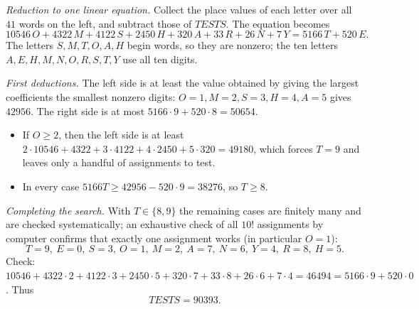 \emph{Reduction to one linear equation.} Collect the place values of each letter over all \(41\) words on the left, and subtract those of \(TESTS\). The equation becomes
\[
10546\,O+4322\,M+4122\,S+2450\,H+320\,A+33\,R+26\,N+7\,Y=5166\,T+520\,E .
\]
The letters \(S,M,T,O,A,H\) begin words, so they are nonzero; the ten letters \(A,E,H,M,N,O,R,S,T,Y\) use all ten digits.

\emph{First deductions.} The left side is at least the value obtained by giving the largest coefficients the smallest nonzero digits: \(O=1,M=2,S=3,H=4,A=5\) gives \(42956\). The right side is at most \(5166\cdot9+520\cdot8=50654\).
\begin{itemize}
\item If \(O\ge2\), then the left side is at least \(2\cdot10546+4322+3\cdot4122+4\cdot2450+5\cdot320=49180\), which forces \(T=9\) and leaves only a handful of assignments to test.
\item In every case \(5166T\ge 42956-520\cdot9=38276\), so \(T\ge8\).
\end{itemize}
\emph{Completing the search.} With \(T\in\{8,9\}\) the remaining cases are finitely many and are checked systematically; an exhaustive check of all \(10!\) assignments by computer confirms that exactly one assignment works (in particular \(O=1\)):
\[
T=9,\ E=0,\ S=3,\ O=1,\ M=2,\ A=7,\ N=6,\ Y=4,\ R=8,\ H=5 .
\]
Check: \(10546+4322\cdot2+4122\cdot3+2450\cdot5+320\cdot7+33\cdot8+26\cdot6+7\cdot4=46494=5166\cdot9+520\cdot0\). Thus
\[
\boxed{TESTS=90393}.
\]
